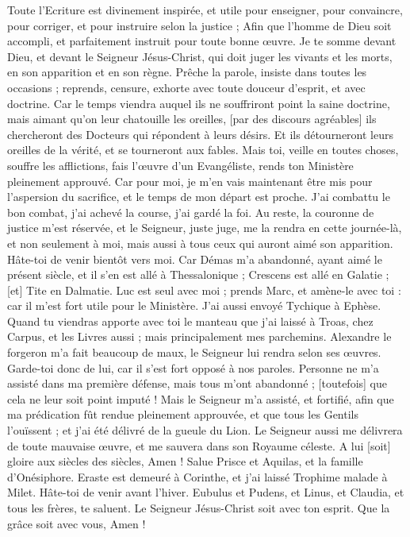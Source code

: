 \begin{multicols}{2}
Toute l'Ecriture est divinement inspirée, et utile pour enseigner, pour convaincre, pour corriger, et pour instruire selon la justice ;
Afin que l'homme de Dieu soit accompli, et parfaitement instruit pour toute bonne œuvre.
\VerseOne{}Je te somme devant Dieu, et devant le Seigneur Jésus-Christ, qui doit juger les vivants et les morts, en son apparition et en son règne.
Prêche la parole, insiste dans toutes les occasions ; reprends, censure, exhorte avec toute douceur d'esprit, et avec doctrine.
Car le temps viendra auquel ils ne souffriront point la saine doctrine, mais aimant qu'on leur chatouille les oreilles, [par des discours agréables] ils chercheront des Docteurs qui répondent à leurs désirs.
Et ils détourneront leurs oreilles de la vérité, et se tourneront aux fables.
Mais toi, veille en toutes choses, souffre les afflictions, fais l'œuvre d'un Evangéliste, rends ton Ministère pleinement approuvé.
Car pour moi, je m'en vais maintenant être mis pour l'aspersion du sacrifice, et le temps de mon départ est proche.
J'ai combattu le bon combat, j'ai achevé la course, j'ai gardé la foi.
Au reste, la couronne de justice m'est réservée, et le Seigneur, juste juge, me la rendra en cette journée-là, et non seulement à moi, mais aussi à tous ceux qui auront aimé son apparition.
Hâte-toi de venir bientôt vers moi.
Car Démas m'a abandonné, ayant aimé le présent siècle, et il s'en est allé à Thessalonique ; Crescens est allé en Galatie ; [et] Tite en Dalmatie.
Luc est seul avec moi ; prends Marc, et amène-le avec toi : car il m'est fort utile pour le Ministère.
J'ai aussi envoyé Tychique à Ephèse.
Quand tu viendras apporte avec toi le manteau que j'ai laissé à Troas, chez Carpus, et les Livres aussi ; mais principalement mes parchemins.
Alexandre le forgeron m'a fait beaucoup de maux, le Seigneur lui rendra selon ses œuvres.
Garde-toi donc de lui, car il s'est fort opposé à nos paroles.
Personne ne m'a assisté dans ma première défense, mais tous m'ont abandonné ; [toutefois] que cela ne leur soit point imputé !
Mais le Seigneur m'a assisté, et fortifié, afin que ma prédication fût rendue pleinement approuvée, et que tous les Gentils l'ouïssent ; et j'ai été délivré de la gueule du Lion.
Le Seigneur aussi me délivrera de toute mauvaise œuvre, et me sauvera dans son Royaume céleste. A lui [soit] gloire aux siècles des siècles, Amen !
Salue Prisce et Aquilas, et la famille d'Onésiphore.
Eraste est demeuré à Corinthe, et j'ai laissé Trophime malade à Milet.
Hâte-toi de venir avant l'hiver. Eubulus et Pudens, et Linus, et Claudia, et tous les frères, te saluent.
Le Seigneur Jésus-Christ soit avec ton esprit. Que la grâce soit avec vous, Amen !
\PPE{}
\end{multicols}
